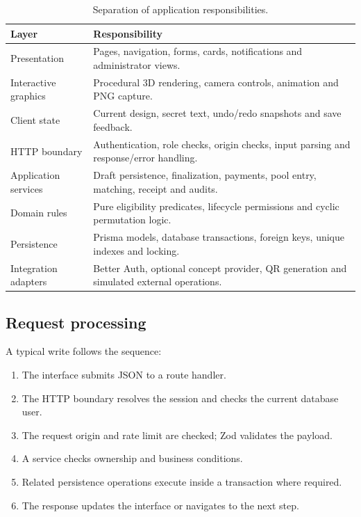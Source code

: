 \documentclass[11pt,a4paper]{article}
\begin{document}
\begin{table}[htbp]
\centering\small
\begin{tabularx}{\textwidth}{p{3.2cm}Y}
\toprule
\textbf{Layer} & \textbf{Responsibility}\\
\midrule
Presentation & Pages, navigation, forms, cards, notifications and administrator views.\\
Interactive graphics & Procedural 3D rendering, camera controls, animation and PNG capture.\\
Client state & Current design, secret text, undo/redo snapshots and save feedback.\\
HTTP boundary & Authentication, role checks, origin checks, input parsing and response/error handling.\\
Application services & Draft persistence, finalization, payments, pool entry, matching, receipt and audits.\\
Domain rules & Pure eligibility predicates, lifecycle permissions and cyclic permutation logic.\\
Persistence & Prisma models, database transactions, foreign keys, unique indexes and locking.\\
Integration adapters & Better Auth, optional concept provider, QR generation and simulated external operations.\\
\bottomrule
\end{tabularx}
\caption{Separation of application responsibilities.}
\end{table}

\subsection{Request processing}
A typical write follows the sequence:
\begin{enumerate}
  \item The interface submits JSON to a route handler.
  \item The HTTP boundary resolves the session and checks the current database user.
  \item The request origin and rate limit are checked; Zod validates the payload.
  \item A service checks ownership and business conditions.
  \item Related persistence operations execute inside a transaction where required.
  \item The response updates the interface or navigates to the next step.
\end{enumerate}
\end{document}
